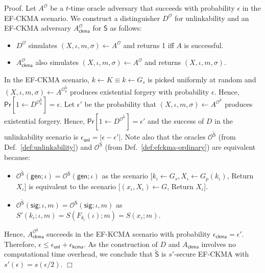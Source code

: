 \documentclass{article}
\newenvironment{proof}{\textsf{Proof}.}{\hfill$\Box$}
\begin{document}
\begin{proof}
Let $A^\mathcal{O}$ be a $t$-time oracle adversary that succeeds with probability $\epsilon$ in the EF-CKMA scenario. We construct a distinguisher $D^\mathcal{O}$ for unlinkability and an EF-CKMA adversary $A^\mathcal{O}_\mathsf{ckma}$ for $\mathsf{S}$ as follows:
\begin{itemize}
\item $D^\mathcal{O}$ simulates $(X,\iota,m,\sigma)\gets A^{\mathcal{O}}$ and returns 1 iff $A$ is successful.
\item $A_\mathsf{ckma}^\mathcal{O}$ also simulates $(X,\iota,m,\sigma)\gets A^{\mathcal{O}}$ and returns $(X,\iota,m,\sigma)$.
\end{itemize}
In the EF-CKMA scenario, $k\gets K \equiv k\gets G_s$ is picked uniformly at random and $(X,\iota,m,\sigma)\gets A^{\mathcal{O}^{\tilde{\mathsf{S}}}_k}$ produces existential forgery with probability $\epsilon$. Hence, $\mathsf{Pr}[1\gets D^{\mathcal{O}^{\tilde{\mathsf{S}}}_k}]=\epsilon$. Let $\epsilon'$ be the probability that $(X,\iota,m,\sigma)\gets A^{\mathcal{O}^{\tilde{\mathcal{S}}}}$
produces existential forgery. Hence,
$\mathsf{Pr}[1\gets D^{\mathcal{O}^{\tilde{\mathsf{S}}}}]=\epsilon'$
and the success of $D$ in the unlinkability scenario is $\epsilon_\mathsf{unl}=|\epsilon-\epsilon'|$.
Note also that the oracles $\mathcal{O}^{\tilde{\mathsf{S}}}$ (from Def.~\ref{def:unlinkability}) and $\mathcal{O}^{\mathsf{S}}$ (from Def.~\ref{def:efckma-ordinary}) are equivalent because:
\begin{itemize}
\item $\mathcal{O}^{\tilde{\mathsf{S}}}(\mathsf{gen};\iota) = \mathcal{O}^{\mathsf{S}}(\mathsf{gen};\iota)$ as the scenario
[$k_\iota \gets G_s, X_\iota \gets G_p(k_\iota)$, Return $X_\iota$]
is equivalent to the scenario
[$(x_\iota, X_\iota)\gets G$, Return $X_\iota$].
\item $\mathcal{O}^{\tilde{\mathsf{S}}}(\mathsf{sig};\iota,m) = \mathcal{O}^{\mathsf{S}}(\mathsf{sig};\iota,m)$ as $S'(k_\iota;\iota,m)=S(F_{k_\iota}(\iota);m)=S(x_\iota;m)$.
\end{itemize}
Hence, $A_\mathsf{ckma}^{\mathcal{O}^\mathsf{S}}$
succeeds in the EF-KCMA scenario with probability $\epsilon_\mathsf{ckma}=\epsilon'$.
Therefore, $\epsilon \le \epsilon_\mathsf{unl}+ \epsilon_\mathsf{kcma}$. As the construction of $D$ and $A_\mathsf{ckma}$ involves no computational time overhead, we conclude that
$\tilde{\mathsf{S}}$ is $s'$-secure EF-CKMA with $s'(\epsilon) = s(\epsilon/2)$.
\end{proof}
\end{document}
